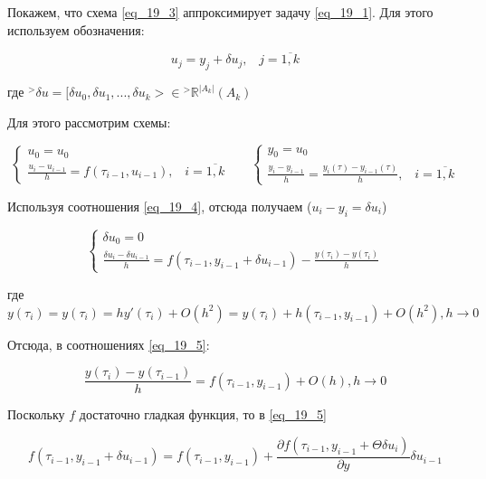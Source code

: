 \documentclass[__main__.tex]{subfiles}
\begin{document}
Покажем, что схема \ref{eq_19_3} аппроксимирует задачу \ref{eq_19_1}. Для этого используем обозначения:

\begin{equation}
\label{eq_19_4}
u_j = y_j + \delta u_j, \;\;\; j = \overline{1, k}
\end{equation}

где ${}^{>}\delta u = [\delta u_0, \delta u_1, ..., \delta u_k > \in {}^{>}\mathbb{R}^{|A_k|}(A_k)$

Для этого рассмотрим схемы:

$$
\begin{cases}
u_0 = u_0\\
\frac{u_i - u_{i - 1}}{h} = f(\tau_{i - 1}, u_{i - 1}), \;\;\; i = \overline{1, k}
\end{cases}
\;\;\;\;\;\;
\begin{cases}
y_0 = u_0\\
\frac{y_i - y_{i-1}}{h} = \frac{y_i(\tau) - y_{i-1}(\tau)}{h}, \;\;\; i = \overline{1, k}
\end{cases}
$$

Используя соотношения \ref{eq_19_4}, отсюда получаем ($u_i - y_i = \delta u_i$)

\begin{equation}
\label{eq_19_5}
\begin{cases}
\delta u_0 = 0\\
\frac{\delta u_i - \delta u_{i - 1}}{h} = f(\tau_{i-1}, y_{i-1} + \delta u_{i-1}) - \frac{y(\tau_i) - y(\tau_i)}{h}
\end{cases}
\end{equation}

где $y(\tau_i) = y(\tau_i) = h y'(\tau_i) + O(h^2) = y(\tau_i) + h(\tau_{i - 1}, y_{i - 1}) + O(h^2), h \to 0$

Отсюда, в соотношениях \ref{eq_19_5}:

\begin{equation}
\label{eq_19_6}
\frac{y(\tau_i) - y(\tau_{i - 1})}{h} = f(\tau_{i - 1}, y_{i - 1}) + O(h), h \to 0
\end{equation}

Поскольку $f$ достаточно гладкая функция, то в \ref{eq_19_5}

\begin{equation}
\label{eq_19_7}
f(\tau_{i - 1}, y_{i - 1} + \delta u_{i - 1}) = f(\tau_{i - 1}, y_{i - 1}) + \frac{\partial f(\tau_{i - 1}, y_{i - 1} + \Theta \delta u_i)}{\partial y}\delta u_{i - 1}
\end{equation}
\end{document}
